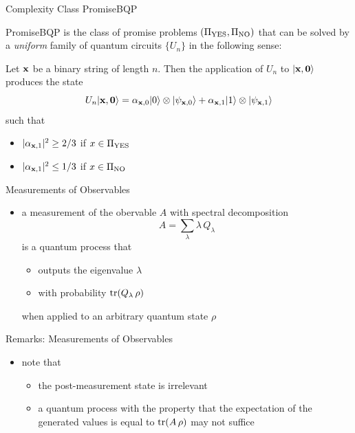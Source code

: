 \documentclass[slideColor]{prosper}
\renewcommand{\>}{\rangle}
\newcommand{\<}{\langle}
\begin{document}
\begin{slide}{Complexity Class PromiseBQP}

PromiseBQP is the class of promise problems $(\Pi_{{\rm YES}},\Pi_{{\rm NO}})$ that can be solved by a {\em uniform} family of quantum circuits $\{U_n\}$ in the following sense:

\bigskip
Let ${\bf x}$ be a binary string of length $n$. Then the application of $U_n$ to $|{\bf x},{\bf 0}\>$ produces the state
\[
U_n |{\bf x},{\bf 0}\> = \alpha_{{\bf x},0}|0\> \otimes |\psi_{{\bf x},0}\> + \alpha_{{\bf x},1}|1\> \otimes |\psi_{{\bf x},1}\>
\]
such that 
\begin{itemize}
\item $|\alpha_{{\bf x},1}|^2\ge 2/3$ if $x\in \Pi_{{\rm YES}}$
\item $|\alpha_{{\bf x},1}|^2\le 1/3$ if $x\in \Pi_{{\rm NO}}$
\end{itemize}

\end{slide}


\begin{slide}{Measurements of Observables}

\begin{itemize}
\item
a measurement of the obervable $A$ with spectral decomposition 
\[
A=\sum_{\lambda} \lambda \, Q_\lambda
\]
is a quantum process that

\medskip
\begin{itemize}
\item outputs the eigenvalue $\lambda$  

\medskip
\item with probability ${\rm tr}(Q_\lambda \, \rho)$
\end{itemize}

\medskip
when applied to an arbitrary quantum state $\rho$
\end{itemize}

\end{slide}


\begin{slide}{Remarks: Measurements of Observables}

\begin{itemize}
\item note that

\begin{itemize}

\medskip
\item the post-measurement state is irrelevant

\medskip
\item a quantum process with the property that the expectation of the generated values is equal to ${\rm tr}(A\,\rho)$ may not suffice
\end{itemize}
\end{itemize}

\end{slide}
\end{document}
